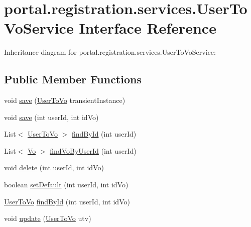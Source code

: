 \hypertarget{interfaceportal_1_1registration_1_1services_1_1UserToVoService}{
\section{portal.registration.services.UserToVoService Interface Reference}
\label{interfaceportal_1_1registration_1_1services_1_1UserToVoService}
}


Inheritance diagram for portal.registration.services.UserToVoService:
\subsection*{Public Member Functions}
\begin{DoxyCompactItemize}
\item 
void \hyperlink{interfaceportal_1_1registration_1_1services_1_1UserToVoService_a870ad36a4e9095735c8f0dfd65fdc960}{save} (\hyperlink{classportal_1_1registration_1_1domain_1_1UserToVo}{UserToVo} transientInstance)
\item 
void \hyperlink{interfaceportal_1_1registration_1_1services_1_1UserToVoService_a016c1201361d43d24ee4cc1a6ea9d249}{save} (int userId, int idVo)
\item 
List$<$ \hyperlink{classportal_1_1registration_1_1domain_1_1UserToVo}{UserToVo} $>$ \hyperlink{interfaceportal_1_1registration_1_1services_1_1UserToVoService_ab5f5da32c585f0fcd1eac1ac0302b733}{findById} (int userId)
\item 
List$<$ \hyperlink{classportal_1_1registration_1_1domain_1_1Vo}{Vo} $>$ \hyperlink{interfaceportal_1_1registration_1_1services_1_1UserToVoService_a1e8049121c67ba84866e0ed608077200}{findVoByUserId} (int userId)
\item 
void \hyperlink{interfaceportal_1_1registration_1_1services_1_1UserToVoService_a0cc57837f0e7dcf3bd50eb9e6160e1a0}{delete} (int userId, int idVo)
\item 
boolean \hyperlink{interfaceportal_1_1registration_1_1services_1_1UserToVoService_af8f698d8e1d75635d5347f37fb9a9ab1}{setDefault} (int userId, int idVo)
\item 
\hyperlink{classportal_1_1registration_1_1domain_1_1UserToVo}{UserToVo} \hyperlink{interfaceportal_1_1registration_1_1services_1_1UserToVoService_ab215f16831a5396fc33cbf61ad09d7cd}{findById} (int userId, int idVo)
\item 
void \hyperlink{interfaceportal_1_1registration_1_1services_1_1UserToVoService_a085c0254ca3f91556da0c51b19ffbdac}{update} (\hyperlink{classportal_1_1registration_1_1domain_1_1UserToVo}{UserToVo} utv)

\end{DoxyCompactItemize}
